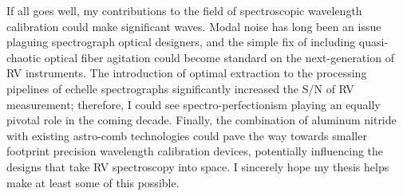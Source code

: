 \documentclass[11pt]{article}
\begin{document}
If all goes well, my contributions to the field of spectroscopic wavelength calibration could make significant waves. Modal noise has long been an issue plaguing spectrograph optical designers, and the simple fix of including quasi-chaotic optical fiber agitation could become standard on the next-generation of RV instruments. The introduction of optimal extraction to the processing pipelines of echelle spectrographs significantly increased the S/N of RV measurement; therefore, I could see spectro-perfectionism playing an equally pivotal role in the coming decade. Finally, the combination of aluminum nitride with existing astro-comb technologies could pave the way towards smaller footprint precision wavelength calibration devices, potentially influencing the designs that take RV spectroscopy into space. I sincerely hope my thesis helps make at least some of this possible.

\pagebreak



\end{document}
